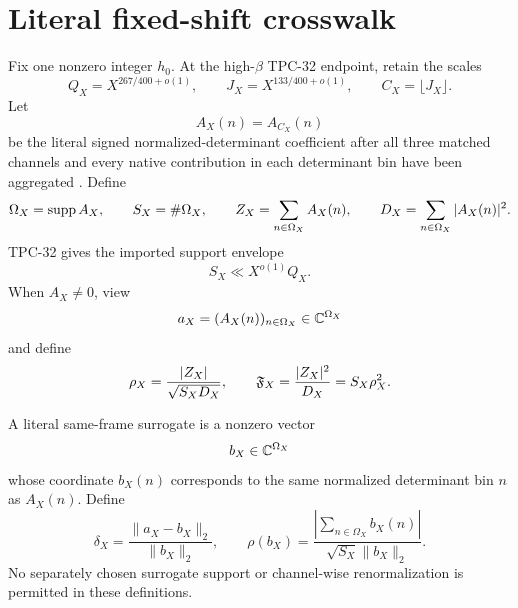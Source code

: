 \section{Literal fixed-shift crosswalk}
\label{sec:literal-crosswalk}

Fix one nonzero integer \(h_0\).  At the high-\(\beta\) TPC-32
endpoint, retain the scales
\begin{equation}
 Q_X=X^{267/400+o(1)},\qquad
 J_X=X^{133/400+o(1)},\qquad
 C_X=\lfloor J_X\rfloor.
\label{eq:critical-scales}
\end{equation}
Let
\[
 A_X(n)=A_{C_X}(n)
\]
be the literal signed normalized-determinant coefficient after all
three matched channels and every native contribution in each
determinant bin have been aggregated \citep{WangTPC32}.  Define
\begin{equation}
 \Omega_X=\operatorname{supp} A_X,\qquad
 S_X=\#\Omega_X,\qquad
 Z_X=\sum_{n\in\Omega_X}A_X(n),\qquad
 D_X=\sum_{n\in\Omega_X}|A_X(n)|^2.
\label{eq:literal-statistics}
\end{equation}
TPC-32 gives the imported support envelope
\begin{equation}
 S_X\ll X^{o(1)}Q_X.
\label{eq:literal-support-envelope}
\end{equation}
When \(A_X\ne0\), view
\[
 a_X=(A_X(n))_{n\in\Omega_X}\in\mathbb C^{\Omega_X}
\]
and define
\begin{equation}
 \rho_X
 =
 \frac{|Z_X|}{\sqrt{S_XD_X}},
 \qquad
 \mathfrak F_X
 =
 \frac{|Z_X|^2}{D_X}
 =
 S_X\rho_X^2.
\label{eq:literal-rho-flat}
\end{equation}

\begin{definition}
\label{def:literal-surrogate}
A literal same-frame surrogate is a nonzero vector
\[
 b_X\in\mathbb C^{\Omega_X}
\]
whose coordinate \(b_X(n)\) corresponds to the same normalized
determinant bin \(n\) as \(A_X(n)\).  Define
\begin{equation}
 \delta_X
 =
 \frac{\|a_X-b_X\|_2}{\|b_X\|_2},
 \qquad
 \rho(b_X)
 =
 \frac{\left|\sum_{n\in\Omega_X}b_X(n)\right|}
 {\sqrt{S_X}\|b_X\|_2}.
\label{eq:literal-surrogate-statistics}
\end{equation}
No separately chosen surrogate support or channel-wise
renormalization is permitted in these definitions.
\end{definition}

